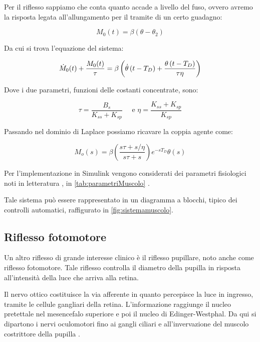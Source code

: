Per il riflesso sappiamo che conta quanto accade a livello del fuso, ovvero avremo la risposta legata all'allungamento per il tramite di un certo guadagno:

\begin{equation}
	M_{0}(t)=\beta\left(\theta-\theta_{2}\right)
\end{equation}

Da cui si trova l'equazione del sistema:

\begin{equation}
	\small{\dot{M}_{0}(t)+\frac{M_{0}(t)}{\tau}=\beta\left(\dot{\theta}\left(t-T_{D}\right)+\frac{\theta\left(t-T_{D}\right)}{\tau \eta}\right)}
\end{equation}

Dove i due parametri, funzioni delle costanti concentrate, sono:

\begin{equation}
	\tau=\frac{B_{s}}{K_{s s}+K_{s p}} \quad \text { e } \eta=\frac{K_{s s}+K_{s p}}{K_{s p}}
\end{equation}

Passando nel dominio di Laplace possiamo ricavare la coppia agente come:

\begin{equation}
	M_{o}(s)=\beta\left(\frac{s \tau+s / \eta}{s \tau+s}\right) e^{-s T_{D}} \theta(s)
\end{equation}

Per l'implementazione in Simulink vengono considerati dei parametri fisiologici noti in letteratura \cite{khoo_physiological_2018,soechting_evaluation_1971}, in \cref{tab:parametriMuscolo} . 

Tale sistema può essere rappresentato in un diagramma a blocchi, tipico dei controlli automatici, raffigurato in \cref{fig:sistemamuscolo}.



\subsection{Riflesso fotomotore}


Un altro riflesso di grande interesse clinico è il riflesso pupillare, noto anche come riflesso fotomotore. Tale riflesso controlla il diametro della pupilla in risposta all'intensità della luce che arriva alla retina.

Il nervo ottico costituisce la via afferente in quanto percepisce la luce in ingresso, tramite  le cellule gangliari della retina. L'informazione raggiunge il nucleo pretettale nel mesencefalo superiore e poi il nucleo di Edinger-Westphal. Da qui si dipartono i nervi oculomotori fino ai gangli ciliari e all'invervazione del muscolo costrittore della pupilla \cite{kandel_principles_2021}.

